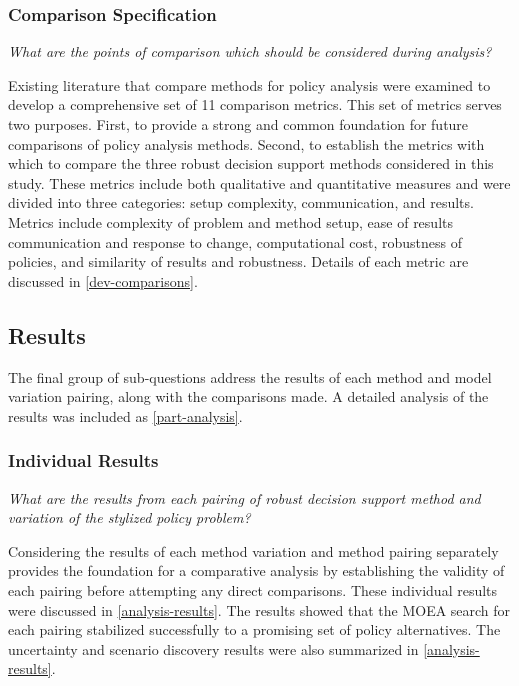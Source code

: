         \subsubsection{Comparison Specification}
        \textit{What are the points of comparison which should be considered during analysis?}
        
        Existing literature that compare methods for policy analysis were examined to develop a comprehensive set of 11 comparison metrics. This set of metrics serves two purposes. First, to provide a strong and common foundation for future comparisons of policy analysis methods. Second, to establish the metrics with which to compare the three robust decision support methods considered in this study. These metrics include both qualitative and quantitative measures and were divided into three categories: setup complexity, communication, and results. Metrics include complexity of problem and method setup, ease of results communication and response to change, computational cost, robustness of policies, and similarity of results and robustness. Details of each metric are discussed in \cref{dev-comparisons}. 
                
    \subsection{Results}
    The final group of sub-questions address the results of each method and model variation pairing, along with the comparisons made. A detailed analysis of the results was included as \cref{part-analysis}. 
    
        \subsubsection{Individual Results}
        \textit{What are the results from each pairing of robust decision support method and variation of the stylized policy problem?}
        
        Considering the results of each method variation and method pairing separately provides the foundation for a comparative analysis by establishing the validity of each pairing before attempting any direct comparisons. These individual results were discussed in \cref{analysis-results}. The results showed that the MOEA search for each pairing stabilized successfully to a promising set of policy alternatives. The uncertainty and scenario discovery results were also summarized in \cref{analysis-results}. 
        
